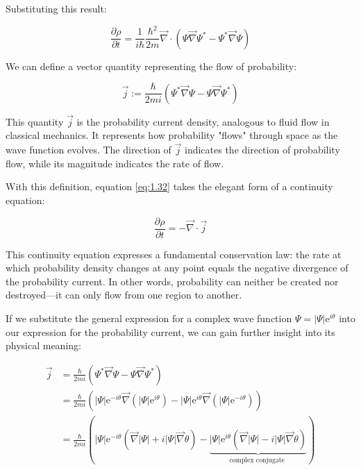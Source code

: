 Substituting this result:

\begin{equation}
\frac{\partial \rho}{\partial t}=\frac{1}{i\hbar}\frac{\hbar^{2}}{2 m} \vec{\nabla} \cdot\left(\Psi \vec{\nabla} \Psi^{*}-\Psi^{*} \vec{\nabla} \Psi\right) \label{eq:1.32}
\end{equation}

We can define a vector quantity representing the flow of probability:

\begin{equation}
\vec{j}:=\frac{\hbar}{2 m i}\left(\Psi^{*} \vec{\nabla} \Psi-\Psi \vec{\nabla} \Psi^{*}\right)
\end{equation}

This quantity $\vec{j}$ is the probability current density, analogous to fluid flow in classical mechanics. It represents how probability "flows" through space as the wave function evolves. The direction of $\vec{j}$ indicates the direction of probability flow, while its magnitude indicates the rate of flow.

With this definition, equation \eqref{eq:1.32} takes the elegant form of a continuity equation:

\begin{equation}
\frac{\partial \rho}{\partial t}=-\vec{\nabla} \cdot \vec{j}
\end{equation}

This continuity equation expresses a fundamental conservation law: the rate at which probability density changes at any point equals the negative divergence of the probability current. In other words, probability can neither be created nor destroyed—it can only flow from one region to another.


If we substitute the general expression for a complex wave function $\Psi=|\Psi| \mathrm{e}^{i \theta}$ into our expression for the probability current, we can gain further insight into its physical meaning:

\begin{align}
\vec{j} &= \frac{\hbar}{2 m i}\left(\Psi^{*} \vec{\nabla} \Psi-\Psi \vec{\nabla} \Psi^{*}\right) \\
&= \frac{\hbar}{2 m i}\left(|\Psi| \mathrm{e}^{-i \theta} \vec{\nabla}\left(|\Psi| \mathrm{e}^{i \theta}\right)-|\Psi| \mathrm{e}^{i \theta} \vec{\nabla}\left(|\Psi| \mathrm{e}^{-i \theta}\right)\right) \\
&= \frac{\hbar}{2 m i}(|\Psi| \mathrm{e}^{-i \theta}(\vec{\nabla}|\Psi|+i|\Psi| \vec{\nabla} \theta)-\underbrace{|\Psi| \mathrm{e}^{i \theta}(\vec{\nabla}|\Psi|-i|\Psi| \vec{\nabla} \theta)}_{\text {complex conjugate }})  \\
\end{align}

